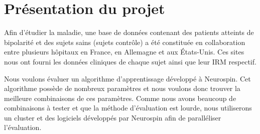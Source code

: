 \section{Présentation du projet}


Afin d'étudier la maladie, une base de données contenant des patients atteints de bipolarité et des sujets sains (sujets contrôle) a été constituée
en collaboration entre plusieurs hôpitaux en France, en Allemagne et aux États-Unis.
Ces sites nous ont fourni les données cliniques de chaque sujet ainsi que leur IRM respectif.

Nous voulons évaluer un algorithme d'apprentissage développé à Neurospin.
Cet algorithme possède de nombreux paramètres et nous voulons donc trouver la meilleure combinaisons de ces paramètres.
Comme nous avons beaucoup de combinaisons à tester et que la méthode d'évaluation est lourde,
nous utiliserons un cluster et des logiciels développés par Neurospin afin de paralléliser l'évaluation.

